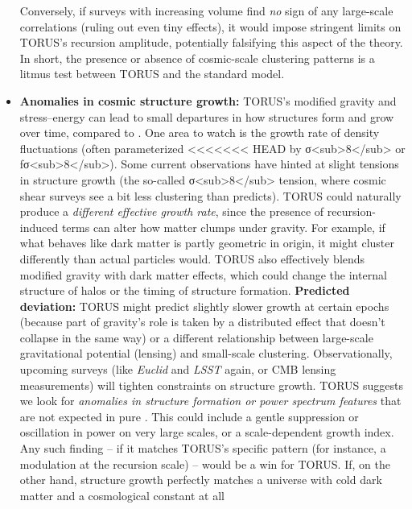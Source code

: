 \documentclass[]{article}
\begin{document}
\begin{itemize}
  Conversely, if surveys with increasing volume find \emph{no} sign of
  any large-scale correlations (ruling out even tiny effects), it would
  impose stringent limits on TORUS's recursion amplitude, potentially
  falsifying this aspect of the theory​. In short, the presence or
  absence of cosmic-scale clustering patterns is a litmus test between
  TORUS and the standard model.
\item
  \textbf{Anomalies in cosmic structure growth:} TORUS's modified
  gravity and stress--energy can lead to small departures in how
  structures form and grow over time, compared to \LambdaCDM. One area to
  watch is the growth rate of density fluctuations (often parameterized
<<<<<<< HEAD
  by σ\textless sub\textgreater8\textless/sub\textgreater{} or
  fσ\textless sub\textgreater8\textless/sub\textgreater). Some current
  observations have hinted at slight tensions in structure growth (the
  so-called σ\textless sub\textgreater8\textless/sub\textgreater{}
  tension, where cosmic shear surveys see a bit less clustering than
  \LambdaCDM predicts). TORUS could naturally produce a \emph{different
  effective growth rate}, since the presence of recursion-induced terms
  can alter how matter clumps under gravity. For example, if what
  behaves like dark matter is partly geometric in origin, it might
  cluster differently than actual particles would. TORUS also
  effectively blends modified gravity with dark matter effects, which
  could change the internal structure of halos or the timing of
  structure formation. \textbf{Predicted deviation:} TORUS might predict
  slightly slower growth at certain epochs (because part of gravity's
  role is taken by a distributed effect that doesn't collapse in the
  same way) or a different relationship between large-scale
  gravitational potential (lensing) and small-scale clustering.
  Observationally, upcoming surveys (like \emph{Euclid} and \emph{LSST}
  again, or CMB lensing measurements) will tighten constraints on
  structure growth. TORUS suggests we look for \emph{anomalies in
  structure formation or power spectrum features} that are not expected
  in pure \LambdaCDM\hspace{0pt}. This could include a gentle suppression or
  oscillation in power on very large scales, or a scale-dependent growth
  index. Any such finding -- if it matches TORUS's specific pattern (for
  instance, a modulation at the recursion scale) -- would be a win for
  TORUS. If, on the other hand, structure growth perfectly matches a
  \LambdaCDM universe with cold dark matter and a cosmological constant at all

\end{itemize}
\end{document}
